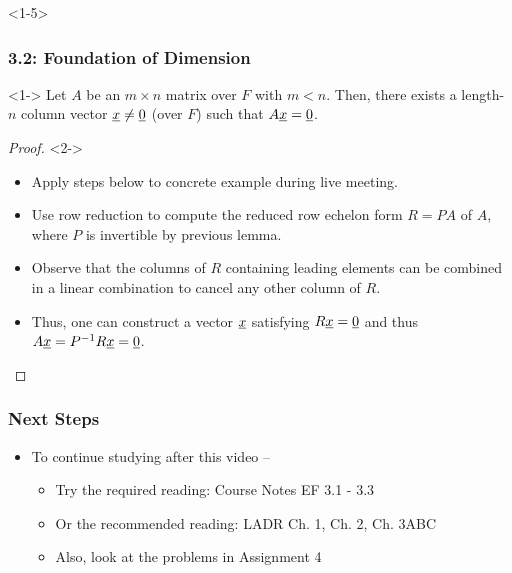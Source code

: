 \documentclass[10pt,english,aspectratio=169]{beamer}
\begin{document}
\begin{frame}<1-5> \frametitle{3.2: Foundation of Dimension}

\begin{lemma}<1->
Let $A$ be an $m \times n$ matrix over $F$ with $m<n$.
Then, there exists a length-$n$ column vector $\underline{x} \neq \underline{0}$ (over $F$) such that $A \underline{x} = \underline{0}$.
\end{lemma}

\begin{proof}<2->
\begin{itemize}
\item<2-> Apply steps below to concrete example during live meeting.

\item<3-> Use row reduction to compute the reduced row echelon form $R=PA$ of $A$, where $P$ is invertible by previous lemma.

\item<4-> Observe that the columns of $R$ containing leading elements can be combined in a linear combination to cancel any other column of $R$.

\item<5-> Thus, one can construct a vector $\underline{x}$ satisfying $R\underline{x}=\underline{0}$ and thus $A \underline{x} = P^{-1} R \underline{x} = \underline{0}$. \hfill \qedhere
\end{itemize}
\end{proof}

\end{frame}

\begin{frame} \frametitle{Next Steps}

\begin{itemize}
\setlength\itemsep{5mm}
\item To continue studying after this video -- \vspace{2mm}

\begin{itemize}
 \setlength\itemsep{3mm}
 \item Try the required reading: Course Notes EF 3.1 - 3.3
 \item Or the recommended reading: LADR Ch. 1, Ch. 2, Ch. 3ABC
 \item Also, look at the problems in Assignment 4
\end{itemize}
\end{itemize}


\end{frame}
\end{document}

